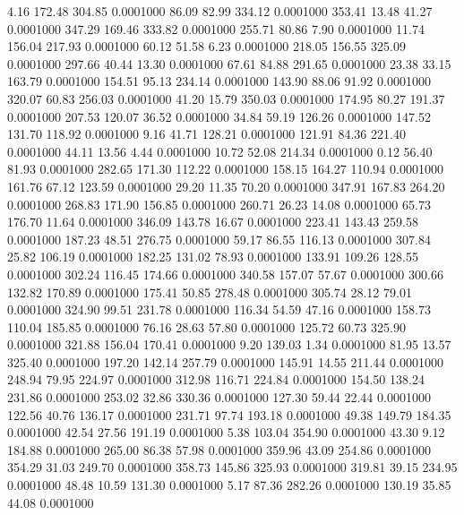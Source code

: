    4.16  172.48  304.85   0.0001000
  86.09   82.99  334.12   0.0001000
 353.41   13.48   41.27   0.0001000
 347.29  169.46  333.82   0.0001000
 255.71   80.86    7.90   0.0001000
  11.74  156.04  217.93   0.0001000
  60.12   51.58    6.23   0.0001000
 218.05  156.55  325.09   0.0001000
 297.66   40.44   13.30   0.0001000
  67.61   84.88  291.65   0.0001000
  23.38   33.15  163.79   0.0001000
 154.51   95.13  234.14   0.0001000
 143.90   88.06   91.92   0.0001000
 320.07   60.83  256.03   0.0001000
  41.20   15.79  350.03   0.0001000
 174.95   80.27  191.37   0.0001000
 207.53  120.07   36.52   0.0001000
  34.84   59.19  126.26   0.0001000
 147.52  131.70  118.92   0.0001000
   9.16   41.71  128.21   0.0001000
 121.91   84.36  221.40   0.0001000
  44.11   13.56    4.44   0.0001000
  10.72   52.08  214.34   0.0001000
   0.12   56.40   81.93   0.0001000
 282.65  171.30  112.22   0.0001000
 158.15  164.27  110.94   0.0001000
 161.76   67.12  123.59   0.0001000
  29.20   11.35   70.20   0.0001000
 347.91  167.83  264.20   0.0001000
 268.83  171.90  156.85   0.0001000
 260.71   26.23   14.08   0.0001000
  65.73  176.70   11.64   0.0001000
 346.09  143.78   16.67   0.0001000
 223.41  143.43  259.58   0.0001000
 187.23   48.51  276.75   0.0001000
  59.17   86.55  116.13   0.0001000
 307.84   25.82  106.19   0.0001000
 182.25  131.02   78.93   0.0001000
 133.91  109.26  128.55   0.0001000
 302.24  116.45  174.66   0.0001000
 340.58  157.07   57.67   0.0001000
 300.66  132.82  170.89   0.0001000
 175.41   50.85  278.48   0.0001000
 305.74   28.12   79.01   0.0001000
 324.90   99.51  231.78   0.0001000
 116.34   54.59   47.16   0.0001000
 158.73  110.04  185.85   0.0001000
  76.16   28.63   57.80   0.0001000
 125.72   60.73  325.90   0.0001000
 321.88  156.04  170.41   0.0001000
   9.20  139.03    1.34   0.0001000
  81.95   13.57  325.40   0.0001000
 197.20  142.14  257.79   0.0001000
 145.91   14.55  211.44   0.0001000
 248.94   79.95  224.97   0.0001000
 312.98  116.71  224.84   0.0001000
 154.50  138.24  231.86   0.0001000
 253.02   32.86  330.36   0.0001000
 127.30   59.44   22.44   0.0001000
 122.56   40.76  136.17   0.0001000
 231.71   97.74  193.18   0.0001000
  49.38  149.79  184.35   0.0001000
  42.54   27.56  191.19   0.0001000
   5.38  103.04  354.90   0.0001000
  43.30    9.12  184.88   0.0001000
 265.00   86.38   57.98   0.0001000
 359.96   43.09  254.86   0.0001000
 354.29   31.03  249.70   0.0001000
 358.73  145.86  325.93   0.0001000
 319.81   39.15  234.95   0.0001000
  48.48   10.59  131.30   0.0001000
   5.17   87.36  282.26   0.0001000
 130.19   35.85   44.08   0.0001000
